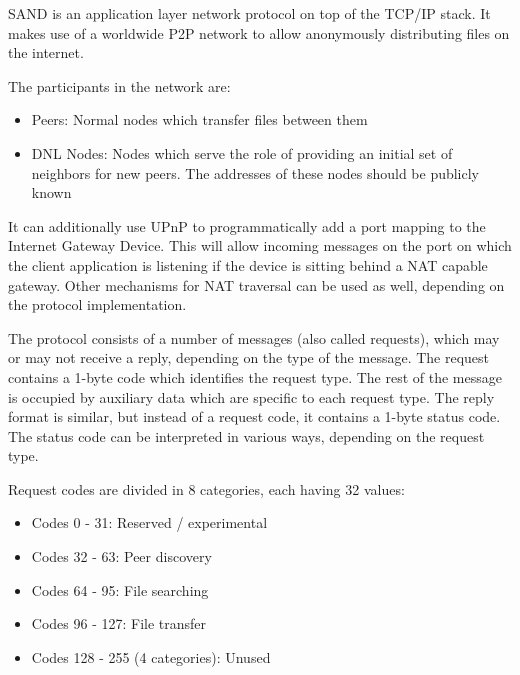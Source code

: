 SAND is an application layer network protocol on top of the TCP/IP stack. It 
makes use of a worldwide P2P network to allow anonymously distributing files on 
the internet.

The participants in the network are:
\begin{itemize}
    \item Peers: Normal nodes which transfer files between them
    \item DNL Nodes: Nodes which serve the role of providing an initial set of 
neighbors for new peers. The addresses of these nodes should be publicly known
\end{itemize}

It can additionally use UPnP to programmatically add a port mapping to the 
Internet Gateway Device. This will allow incoming messages on the port on which 
the client application is listening if the device is sitting behind a NAT 
capable gateway. Other mechanisms for NAT traversal can be used as well, 
depending on the protocol implementation.

The protocol consists of a number of messages (also called requests), which may 
or may not receive a reply, depending on the type of the message. The request 
contains a 1-byte code which identifies the request type. The rest of the 
message is occupied by auxiliary data which are specific to each request type. 
The reply format is similar, but instead of a request code, it contains a 
1-byte status code. The status code can be interpreted in various ways, 
depending on the request type.

\begin{figure}[H]
    \centering
\end{figure}

Request codes are divided in 8 categories, each having 32 values:
\begin{itemize}
    \item Codes 0 - 31: Reserved / experimental
    \item Codes 32 - 63: Peer discovery
    \item Codes 64 - 95: File searching
    \item Codes 96 - 127: File transfer
    \item Codes 128 - 255 (4 categories): Unused
\end{itemize}
